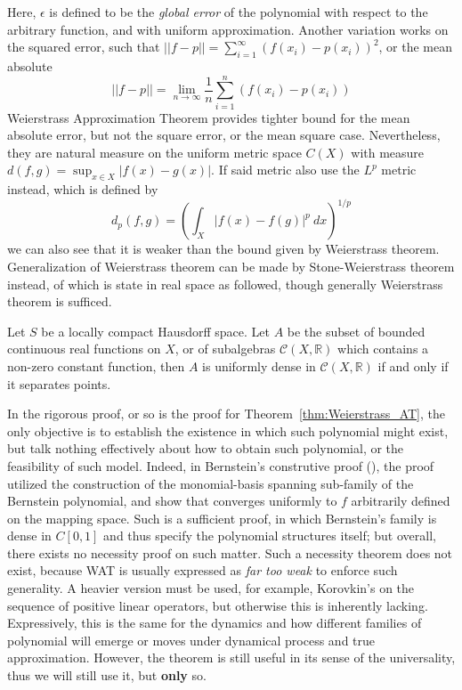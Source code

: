Here, $\epsilon$ is defined to be the \textit{global error} of the polynomial with respect to the arbitrary function, and with uniform approximation. Another variation works on the squared error, such that $||f-p||=\sum_{i=1}^{\infty}(f(x_{i})-p(x_{i}))^{2}$, or the mean absolute $$||f-p||=\lim_{n\to\infty}\frac{1}{n}\sum_{i=1}^{n}(f(x_{i})-p(x_{i}))$$
Weierstrass Approximation Theorem provides tighter bound for the mean absolute error, but not the square error, or the mean square case. Nevertheless, they are natural measure on the uniform metric space $C(X)$ with measure $d(f,g)=\sup_{x\in X}|f(x)-g(x)|$. If said metric also use the $L^{p}$ metric instead, which is defined by 
\begin{equation}
    d_{p}(f,g) = \left(\int_{X}|f(x)-f(g)|^{p}\:dx\right)^{1/p}
\end{equation}
we can also see that it is weaker than the bound given by Weierstrass theorem. Generalization of Weierstrass theorem can be made by Stone-Weierstrass theorem instead, of which is state in real space as followed, though generally Weierstrass theorem is sufficed.
\begin{theorem}
  Let $S$ be a locally compact Hausdorff space. Let $A$ be the subset of bounded continuous real functions on $X$, or of subalgebras $\mathcal{C}(X,\mathbb{R})$ which contains a non-zero constant function, then $A$ is uniformly dense in $\mathcal{C}(X,\mathbb{R})$ if and only if it separates points. 
\end{theorem}

In the rigorous proof, or so is the proof for Theorem~\ref{thm:Weierstrass_AT}, the only objective is to establish the existence in which such polynomial might exist, but talk nothing effectively about how to obtain such polynomial, or the feasibility of such model. Indeed, in Bernstein's construtive proof (\cite{sury2019weierstrass,bernsprob2023}), the proof utilized the construction of the monomial-basis spanning sub-family of the Bernstein polynomial, and show that converges uniformly to $f$ arbitrarily defined on the mapping space. Such is a sufficient proof, in which Bernstein's family is dense in $C[0,1]$ and thus specify the polynomial structures itself; but overall, there exists no necessity proof on such matter. Such a necessity theorem does not exist, because WAT is usually expressed as \textit{far too weak} to enforce such generality. A heavier version must be used, for example, Korovkin's on the sequence of positive linear operators, but otherwise this is inherently lacking. Expressively, this is the same for the dynamics and how different families of polynomial will emerge or moves under dynamical process and true approximation. However, the theorem is still useful in its sense of the universality, thus we will still use it, but \textbf{only} so. 

